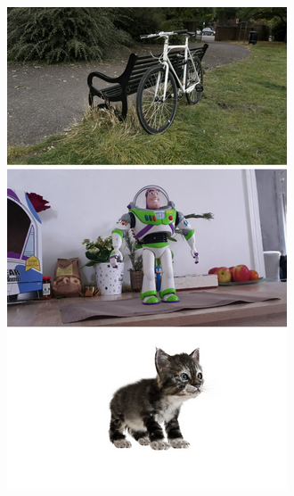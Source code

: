 \begin{figure}[ht]
  \centering
  \begin{subfigure}{0.14\linewidth}
 \includegraphics[width=\linewidth]{images/composition/buzz_riding_cat/scenes.png}

\end{subfigure}
\end{figure}
